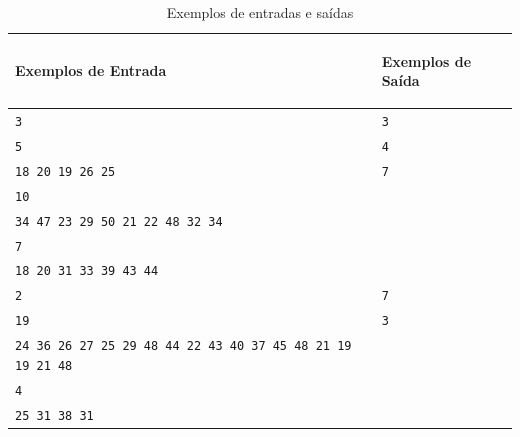 \begin{table}[ht]
    \centering
    \begin{tabular}{|p{7cm}|p{7cm}|}
        \hline
        \begin{center}
            \vspace{-0.3cm}
            \textbf{Exemplos de Entrada}
            \vspace{-0.3cm}
        \end{center} 
         &  
        \begin{center}
            \vspace{-0.3cm}
            \textbf{Exemplos de Saída}
            \vspace{-0.3cm}
        \end{center} \\ \hline
         \texttt{3} & \texttt{3} \\  
         \texttt{5} & \texttt{4} \\
         \texttt{18 20 19 26 25} & \texttt{7} \\
         \texttt{10} & \texttt{} \\
         \texttt{34 47 23 29 50 21 22 48 32 34} & \texttt{} \\
         \texttt{7} & \texttt{} \\
         \texttt{18 20 31 33 39 43 44} & \texttt{} \\
         \hline
         \texttt{2} & \texttt{7} \\  
         \texttt{19} & \texttt{3} \\
         \texttt{24 36 26 27 25 29 48 44 22 43 40 37 45 48 21 19 19 21 48} & \texttt{} \\
         \texttt{4} & \texttt{} \\
         \texttt{25 31 38 31} & \texttt{} \\
         \hline
    \end{tabular}
    \caption{Exemplos de entradas e saídas}
\end{table}

\newpage

\begin{center}
\noindent

\end{center}